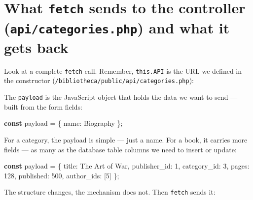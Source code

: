 \documentclass[11pt,a4paper,oneside]{book}
\newenvironment{Shaded}{\begin{snugshade}}{\end{snugshade}}
\newcommand{\KeywordTok}[1]{\textcolor[HTML]{007020}{\textbf{#1}}}
\newcommand{\DataTypeTok}[1]{\textcolor[HTML]{902000}{#1}}
\newcommand{\DecValTok}[1]{\textcolor[HTML]{40A070}{#1}}
\newcommand{\StringTok}[1]{\textcolor[HTML]{4070A0}{#1}}
\newcommand{\OperatorTok}[1]{\textcolor[HTML]{666666}{#1}}
\newcommand{\NormalTok}[1]{#1}
\begin{document}
\hypertarget{what-fetch-sends-to-the-controller-apicategories.php-and-what-it-gets-back}{%
\section{\texorpdfstring{What \texttt{fetch} sends to the
controller (\texttt{api/categories.php}) and what it gets
back}{What fetch sends to the controller (api/categories.php) and what it gets back}}\label{what-fetch-sends-to-the-controller-apicategories.php-and-what-it-gets-back}}

Look at a complete \texttt{fetch} call. Remember,
\texttt{this.API} is the URL we defined in the constructor
(\texttt{/bibliotheca/public/api/categories.php}):

The \texttt{payload} is the JavaScript object that holds the data
we want to send --- built from the form fields:

\begin{Shaded}
\begin{Highlighting}[]
\KeywordTok{const}\NormalTok{ payload }\OperatorTok{=}\NormalTok{ \{ }\DataTypeTok{name}\OperatorTok{:} \StringTok{\textquotesingle{}Biography\textquotesingle{}}\NormalTok{ \}}\OperatorTok{;}
\end{Highlighting}
\end{Shaded}

For a category, the payload is simple --- just a name. For a
book, it carries more fields --- as many as the database table
columns we need to insert or update:

\begin{Shaded}
\begin{Highlighting}[]
\KeywordTok{const}\NormalTok{ payload }\OperatorTok{=}\NormalTok{ \{}
    \DataTypeTok{title}\OperatorTok{:} \StringTok{\textquotesingle{}The Art of War\textquotesingle{}}\OperatorTok{,}
    \DataTypeTok{publisher\_id}\OperatorTok{:} \DecValTok{1}\OperatorTok{,}
    \DataTypeTok{category\_id}\OperatorTok{:} \DecValTok{3}\OperatorTok{,}
    \DataTypeTok{pages}\OperatorTok{:} \DecValTok{128}\OperatorTok{,}
    \DataTypeTok{published}\OperatorTok{:} \DecValTok{500}\OperatorTok{,}
    \DataTypeTok{author\_ids}\OperatorTok{:}\NormalTok{ [}\DecValTok{5}\NormalTok{]}
\NormalTok{\}}\OperatorTok{;}
\end{Highlighting}
\end{Shaded}

The structure changes, the mechanism does not. Then
\texttt{fetch} sends it:
\end{document}
